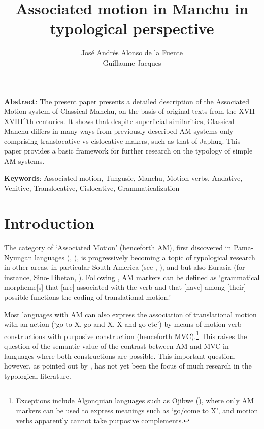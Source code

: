\documentclass{article}
\begin{document}
 
\title{Associated motion in Manchu in typological perspective }
\author{José Andrés Alonso de la Fuente\\Guillaume Jacques}
\maketitle 
\textbf{Abstract}: The present paper presents a detailed description of the Associated Motion system of Classical Manchu, on the basis of original texts from the XVII-XVIII^{th} centuries. It shows that despite superficial similarities, Classical Manchu differs in many ways from previously described AM systems only comprising translocative vs cislocative makers, such as that of Japhug. This paper provides a basic framework for further research on the typology of simple AM systems.

\textbf{Keywords}: Associated motion, Tungusic, Manchu, Motion verbs, Andative, Venitive, Translocative, Cislocative, Grammaticalization

\section*{Introduction}
The category of `Associated Motion' (henceforth AM), first discovered in Pama-Nyungan languages (\citealt{koch84associated.motion}, \citealt{wilkins91associated.motion}), is progressively becoming a topic of typological research in other areas, in particular South America (see \citealt{guillaume08cavinena}, \citealt{guillaume16am}), and but also Eurasia (for instance, Sino-Tibetan, \citealt{jacques13harmonization}). Following \citet[12]{guillaume16am}, AM markers can be defined as `grammatical morpheme[s] that [are] associated with the verb
and that [have] among [their] possible functions the coding of translational
motion.'

Most languages with AM can also express the association of translational motion with an action (`go to X, go and X, X and go etc')  by means of motion verb constructions with purposive construction (henceforth MVC).\footnote{Exceptions include Algonquian languages such as Ojibwe (\citealt[729-733]{valentine01grammar}), where only AM markers can be used to express meanings such as `go/come to X', and motion verbs apparently cannot take purposive complements.} This raises the question of the semantic value of the contrast between AM and MVC in languages where both constructions are possible. This important question, however, as pointed out by \citet[10]{guillaume16am}, has not yet been the focus of much research in the typological literature.
\end{document}
